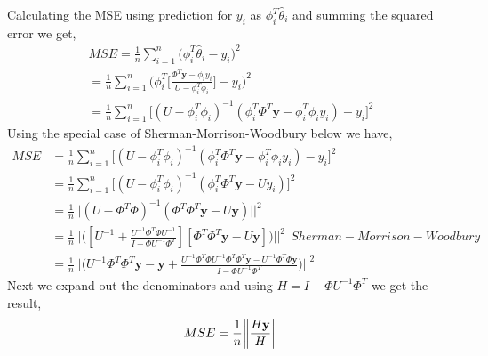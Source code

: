 \documentclass{article}
\begin{document}
Calculating the MSE using prediction for $y_i$ as $\phi_i^T\hat{\theta}_i$ and summing the squared error we get,
\begin{align*}
    MSE = \frac{1}{n}\sum_{i=1}^{n}\biggl(\phi_i^T\hat{\theta}_i-y_i\biggr)^2\\
    =\frac{1}{n}\sum_{i=1}^{n}\biggl(\phi_i^T\biggl[\frac{\Phi^T\mathbf{y} - \phi_iy_i}{U - \phi_i^T\phi_i }\biggr] - y_i\biggr)^2 \\
    =\frac{1}{n}\sum_{i=1}^{n}\biggl[(U - \phi_i^T\phi_i)^{-1}(\phi_i^T\Phi^T\mathbf{y} - \phi_i^T\phi_iy_i) - y_i\biggr]^2 
\end{align*}
Using the special case of Sherman-Morrison-Woodbury below we have,
\begin{align*}
    MSE &= \frac{1}{n}\sum_{i=1}^{n}\biggl[(U - \phi_i^T\phi_i)^{-1}(\phi_i^T\Phi^T\mathbf{y} - \phi_i^T\phi_iy_i) - y_i\biggr]^2 \\
    &=  \frac{1}{n}\sum_{i=1}^{n}\biggl[(U - \phi_i^T\phi_i)^{-1}(\phi_i^T\Phi^T\mathbf{y} - U y_i)\biggr]^2 \\
    &= \frac{1}{n}||(U - \Phi^T\Phi)^{-1}(\Phi^T\Phi^T\mathbf{y} - U \mathbf{y})||^2 \\
    &=  \frac{1}{n}||\biggl([U^{-1}+\frac{U^{-1}\Phi^T\Phi U^{-1}}{I-\Phi U^{-1}\Phi^T}] [\Phi^T\Phi^T\mathbf{y} - U \mathbf{y}]\biggr)||^2 \ \ Sherman-Morrison-Woodbury\\
    &= \frac{1}{n}||\biggl(U^{-1}\Phi^T\Phi^T\mathbf{y}-\mathbf{y}+\frac{U^{-1}\Phi^T\Phi U^{-1}\Phi^T\Phi^T\mathbf{y}- U^{-1}\Phi^T\Phi \mathbf{y}}{I-\Phi U^{-1}\Phi^T}\biggr)||^2
\end{align*}
Next we expand out the denominators and using $H = I-\Phi U^{-1}\Phi^T$ we get the result,
\begin{align*}
    MSE = \frac{1}{n} \norm{\frac{H \mathbf{y}}{H}}
\end{align*}
\end{document}
